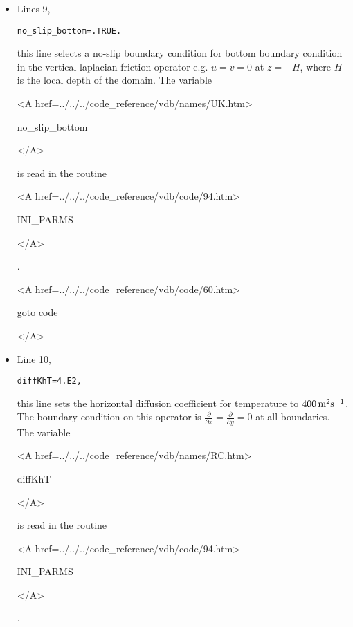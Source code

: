 \begin{itemize}
\item Lines 9,
\begin{verbatim}
no_slip_bottom=.TRUE.
\end{verbatim}
this line selects a no-slip boundary condition for bottom
boundary condition in the vertical laplacian friction operator 
e.g. $u=v=0$ at $z=-H$, where $H$ is the local depth of the domain.
The variable
{\bf
\begin{rawhtml} <A href=../../../code_reference/vdb/names/UK.htm> \end{rawhtml}
no\_slip\_bottom
\begin{rawhtml} </A>\end{rawhtml}
}
is read in the routine
{\it
\begin{rawhtml} <A href=../../../code_reference/vdb/code/94.htm> \end{rawhtml}
INI\_PARMS
\begin{rawhtml} </A>\end{rawhtml}
}.

{\bf
\begin{rawhtml} <A href=../../../code_reference/vdb/code/60.htm> \end{rawhtml}
goto code
\begin{rawhtml} </A>\end{rawhtml}
}

\item Line 10,
\begin{verbatim}
diffKhT=4.E2,
\end{verbatim}
this line sets the horizontal diffusion coefficient for temperature
to $400\,{\rm m^{2}s^{-1}}$. The boundary condition on this
operator is $\frac{\partial}{\partial x}=\frac{\partial}{\partial y}=0$ at
all boundaries.
The variable
{\bf
\begin{rawhtml} <A href=../../../code_reference/vdb/names/RC.htm> \end{rawhtml}
diffKhT
\begin{rawhtml} </A>\end{rawhtml}
}
is read in the routine
{\it
\begin{rawhtml} <A href=../../../code_reference/vdb/code/94.htm> \end{rawhtml}
INI\_PARMS
\begin{rawhtml} </A>\end{rawhtml}
}.


\end{itemize}
